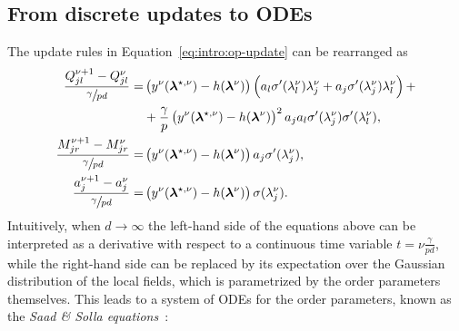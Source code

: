 \subsection{From discrete updates to ODEs}
The update rules in Equation~\eqref{eq:intro:op-update} can be rearranged as
\begin{equation}
\begin{aligned}
    \frac{Q^{\nu+1}_{jl}-Q^{\nu}_{jl}}{\sfrac{\gamma}{pd}} =& \left( y^\nu({\boldsymbol{\lambda}}^{\star,\nu}) - h({\boldsymbol{\lambda}}^{\nu}) \right) \left( a_l \sigma'(\lambda^\nu_l) \lambda^\nu_j + a_j \sigma'(\lambda^\nu_j) \lambda^\nu_l  \right) + \\ & + \frac{\gamma}{p}\left( y^\nu({\boldsymbol{\lambda}}^{\star,\nu}) - h({\boldsymbol{\lambda}}^{\nu}) \right)^2 a_j a_l \sigma'(\lambda^\nu_j) \sigma'(\lambda^\nu_l), \\
    \frac{M^{\nu+1}_{jr}-M^{\nu}_{jr}}{\sfrac{\gamma}{pd}} =& \left( y^\nu({\boldsymbol{\lambda}}^{\star,\nu}) - h({\boldsymbol{\lambda}}^{\nu}) \right) a_j \sigma'(\lambda^\nu_j), \\
    \frac{a_j^{\nu+1}-a_j^{\nu}}{\sfrac{\gamma}{pd}} =& \left( y^\nu({\boldsymbol{\lambda}}^{\star,\nu}) - h({\boldsymbol{\lambda}}^{\nu}) \right) \sigma(\lambda^\nu_j).
\end{aligned}
\end{equation}
Intuitively, when \(d\to\infty\) the left-hand side of the equations above can be interpreted as a derivative with respect to a continuous time variable \(t = \nu \frac{\gamma}{pd}\), while the right-hand side can be replaced by its expectation over the Gaussian distribution of the local fields, which is parametrized by the order parameters themselves.  This leads to a system of ODEs for the order parameters, known as the \emph{Saad \& Solla equations}~\cite{saad1995exact,saad1996dynamics}:

